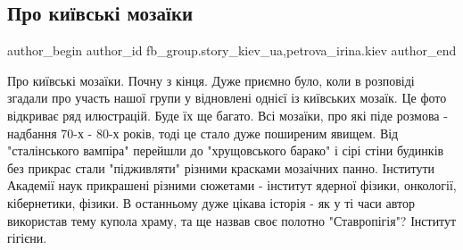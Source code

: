  
 
 
 
 
 
\subsection{Про київські мозаїки}
\label{sec:30_04_2020.fb.fb_group.story_kiev_ua.2.kievskie_mozaiki}
 
\ifcmt
 author_begin
   author_id fb_group.story_kiev_ua,petrova_irina.kiev
 author_end
\fi

Про київські мозаїки. Почну з кінця. Дуже приємно було, коли в розповіді
згадали про участь нашої групи у відновлені однієї із київських мозаїк. Це фото
відкриває ряд илюстрацій. Буде їх ще багато. Всі мозаїки, про які піде розмова
- надбання 70-х - 80-х років, тоді це стало дуже поширеним явищем. Від
"сталінського  вампіра" перейшли до "хрущовського барако" і сірі стіни будинків
без прикрас стали "підживляти" різними красками мозаічних панно. Інститути
Академії наук  прикрашені різними сюжетами - інститут ядерної фізики,
онкології, кібернетики, фізики. В останньому дуже цікава історія - як у ті часи
автор використав тему купола храму, та ще назвав своє полотно "Ставропігія"?
Інститут гігієни.

